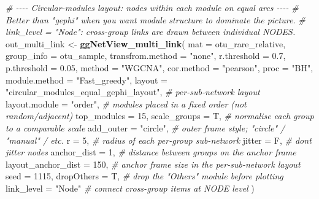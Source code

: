 \documentclass[
]{book}
\newenvironment{Shaded}{\begin{snugshade}}{\end{snugshade}}
\newcommand{\AttributeTok}[1]{\textcolor[rgb]{0.13,0.29,0.53}{#1}}
\newcommand{\CommentTok}[1]{\textcolor[rgb]{0.56,0.35,0.01}{\textit{#1}}}
\newcommand{\DecValTok}[1]{\textcolor[rgb]{0.00,0.00,0.81}{#1}}
\newcommand{\FloatTok}[1]{\textcolor[rgb]{0.00,0.00,0.81}{#1}}
\newcommand{\FunctionTok}[1]{\textcolor[rgb]{0.13,0.29,0.53}{\textbf{#1}}}
\newcommand{\NormalTok}[1]{#1}
\newcommand{\OtherTok}[1]{\textcolor[rgb]{0.56,0.35,0.01}{#1}}
\newcommand{\StringTok}[1]{\textcolor[rgb]{0.31,0.60,0.02}{#1}}
\begin{document}
\begin{Shaded}
\begin{Highlighting}[]
\CommentTok{\# {-}{-}{-}{-} Circular{-}modules layout: nodes within each module on equal arcs {-}{-}{-}{-}}
\CommentTok{\# Better than "gephi" when you want module structure to dominate the picture.}
\CommentTok{\# \textasciigrave{}link\_level = "Node"\textasciigrave{}: cross{-}group links are drawn between individual NODES.}
\NormalTok{out\_multi\_link }\OtherTok{\textless{}{-}} \FunctionTok{ggNetView\_multi\_link}\NormalTok{(}
  \AttributeTok{mat                 =}\NormalTok{ otu\_rare\_relative,}
  \AttributeTok{group\_info          =}\NormalTok{ otu\_sample,}
  \AttributeTok{transfrom.method    =} \StringTok{"none"}\NormalTok{,}
  \AttributeTok{r.threshold         =} \FloatTok{0.7}\NormalTok{,}
  \AttributeTok{p.threshold         =} \FloatTok{0.05}\NormalTok{,}
  \AttributeTok{method              =} \StringTok{"WGCNA"}\NormalTok{,}
  \AttributeTok{cor.method          =} \StringTok{"pearson"}\NormalTok{,}
  \AttributeTok{proc                =} \StringTok{"BH"}\NormalTok{,}
  \AttributeTok{module.method       =} \StringTok{"Fast\_greedy"}\NormalTok{,}
  \AttributeTok{layout              =} \StringTok{"circular\_modules\_equal\_gephi\_layout"}\NormalTok{, }\CommentTok{\# per{-}sub{-}network layout}
  \AttributeTok{layout.module       =} \StringTok{"order"}\NormalTok{,        }\CommentTok{\# modules placed in a fixed order (not random/adjacent)}
  \AttributeTok{top\_modules         =} \DecValTok{15}\NormalTok{,}
  \AttributeTok{scale\_groups        =}\NormalTok{ T,              }\CommentTok{\# normalise each group to a comparable scale}
  \AttributeTok{add\_outer           =} \StringTok{"circle"}\NormalTok{,       }\CommentTok{\# outer frame style; "circle" / "manual" / etc.}
  \AttributeTok{r                   =} \DecValTok{5}\NormalTok{,              }\CommentTok{\# radius of each per{-}group sub{-}network}
  \AttributeTok{jitter              =}\NormalTok{ F,              }\CommentTok{\# don\textquotesingle{}t jitter nodes}
  \AttributeTok{anchor\_dist         =} \DecValTok{1}\NormalTok{,              }\CommentTok{\# distance between groups on the anchor frame}
  \AttributeTok{layout\_anchor\_dist  =} \DecValTok{150}\NormalTok{,            }\CommentTok{\# anchor frame size in the per{-}sub{-}network layout}
  \AttributeTok{seed                =} \DecValTok{1115}\NormalTok{,}
  \AttributeTok{dropOthers          =}\NormalTok{ T,              }\CommentTok{\# drop the "Others" module before plotting}
  \AttributeTok{link\_level          =} \StringTok{"Node"}          \CommentTok{\# connect cross{-}group items at NODE level}
\NormalTok{)}
\end{Highlighting}
\end{Shaded}
\end{document}
